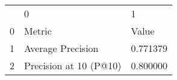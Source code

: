 \begin{tabular}{lll}
 & 0 & 1 \\
0 & Metric & Value \\
1 & Average Precision & 0.771379 \\
2 & Precision at 10 (P@10) & 0.800000 \\
\end{tabular}
